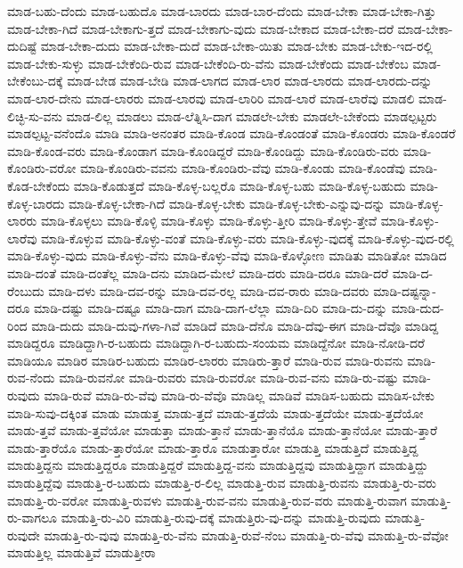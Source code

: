 {ಮಾಡ-ಬಹು-ದೆಂದು
ಮಾಡ-ಬಹುದೊ
ಮಾಡ-ಬಾರದು
ಮಾಡ-ಬಾರ-ದೆಂದು
ಮಾಡ-ಬೇಕಾ
ಮಾಡ-ಬೇಕಾ-ಗಿತ್ತು
ಮಾಡ-ಬೇಕಾ-ಗಿದೆ
ಮಾಡ-ಬೇಕಾಗು-ತ್ತದೆ
ಮಾಡ-ಬೇಕಾಗು-ವುದು
ಮಾಡ-ಬೇಕಾದ
ಮಾಡ-ಬೇಕಾ-ದರೆ
ಮಾಡ-ಬೇಕಾ-ದುದಿಷ್ಟೆ
ಮಾಡ-ಬೇಕಾ-ದುದು
ಮಾಡ-ಬೇಕಾ-ದುದೆ
ಮಾಡ-ಬೇಕಾ-ಯಿತು
ಮಾಡ-ಬೇಕು
ಮಾಡ-ಬೇಕು-ಇದ-ರಲ್ಲಿ
ಮಾಡ-ಬೇಕು-ಸುಳ್ಳು
ಮಾಡ-ಬೇಕೆಂದಿ-ರುವ
ಮಾಡ-ಬೇಕೆಂದಿ-ರು-ವೆನು
ಮಾಡ-ಬೇಕೆಂದು
ಮಾಡ-ಬೇಕೆಂಬ
ಮಾಡ-ಬೇಕೆಂಬು-ದಕ್ಕೆ
ಮಾಡ-ಬೇಡ
ಮಾಡ-ಬೇಡಿ
ಮಾಡ-ಲಾಗದ
ಮಾಡ-ಲಾರ
ಮಾಡ-ಲಾರದು
ಮಾಡ-ಲಾರದು-ದನ್ನು
ಮಾಡ-ಲಾರ-ದೇನು
ಮಾಡ-ಲಾರರು
ಮಾಡ-ಲಾರವು
ಮಾಡ-ಲಾರಿರಿ
ಮಾಡ-ಲಾರೆ
ಮಾಡ-ಲಾರೆವು
ಮಾಡಲಿ
ಮಾಡ-ಲಿಚ್ಛಿ-ಸು-ವನು
ಮಾಡ-ಲಿಲ್ಲ
ಮಾಡಲು
ಮಾಡ-ಲೆತ್ನಿಸಿ-ದಾಗ
ಮಾಡಲೇ-ಬೇಕು
ಮಾಡಲೇ-ಬೇಕೆಂದು
ಮಾಡಲ್ಪಟ್ಟರು
ಮಾಡಲ್ಪಟ್ಟ-ವನೆಂದೊ
ಮಾಡಿ
ಮಾಡಿ-ಅನಂತರ
ಮಾಡಿ-ಕೊಂಡ
ಮಾಡಿ-ಕೊಂಡಂತೆ
ಮಾಡಿ-ಕೊಂಡರು
ಮಾಡಿ-ಕೊಂಡರೆ
ಮಾಡಿ-ಕೊಂಡ-ವರು
ಮಾಡಿ-ಕೊಂಡಾಗ
ಮಾಡಿ-ಕೊಂಡಿದ್ದರೆ
ಮಾಡಿ-ಕೊಂಡಿದ್ದು
ಮಾಡಿ-ಕೊಂಡಿರು-ವರು
ಮಾಡಿ-ಕೊಂಡಿರು-ವರೋ
ಮಾಡಿ-ಕೊಂಡಿರು-ವವನು
ಮಾಡಿ-ಕೊಂಡಿರು-ವೆವು
ಮಾಡಿ-ಕೊಂಡು
ಮಾಡಿ-ಕೊಂಡೆವು
ಮಾಡಿ-ಕೊಡ-ಬೇಕೆಂದು
ಮಾಡಿ-ಕೊಡುತ್ತದೆ
ಮಾಡಿ-ಕೊಳ್ಳ-ಬಲ್ಲರೊ
ಮಾಡಿ-ಕೊಳ್ಳ-ಬಹು
ಮಾಡಿ-ಕೊಳ್ಳ-ಬಹುದು
ಮಾಡಿ-ಕೊಳ್ಳ-ಬಾರದು
ಮಾಡಿ-ಕೊಳ್ಳ-ಬೇಕಾ-ಗಿದೆ
ಮಾಡಿ-ಕೊಳ್ಳ-ಬೇಕು
ಮಾಡಿ-ಕೊಳ್ಳ-ಬೇಕು-ಎನ್ನುವು-ದನ್ನು
ಮಾಡಿ-ಕೊಳ್ಳ-ಲಾರರು
ಮಾಡಿ-ಕೊಳ್ಳಲು
ಮಾಡಿ-ಕೊಳ್ಳಿ
ಮಾಡಿ-ಕೊಳ್ಳು
ಮಾಡಿ-ಕೊಳ್ಳು-ತ್ತೀರಿ
ಮಾಡಿ-ಕೊಳ್ಳು-ತ್ತೇವೆ
ಮಾಡಿ-ಕೊಳ್ಳು-ಲಾರೆವು
ಮಾಡಿ-ಕೊಳ್ಳುವ
ಮಾಡಿ-ಕೊಳ್ಳು-ವಂತೆ
ಮಾಡಿ-ಕೊಳ್ಳು-ವರು
ಮಾಡಿ-ಕೊಳ್ಳು-ವುದಕ್ಕೆ
ಮಾಡಿ-ಕೊಳ್ಳು-ವುದ-ರಲ್ಲಿ
ಮಾಡಿ-ಕೊಳ್ಳು-ವುದು
ಮಾಡಿ-ಕೊಳ್ಳು-ವೆನು
ಮಾಡಿ-ಕೊಳ್ಳು-ವೆವು
ಮಾಡಿ-ಕೊಳ್ಳೋಣ
ಮಾಡಿತು
ಮಾಡಿತೋ
ಮಾಡಿದ
ಮಾಡಿ-ದಂತೆ
ಮಾಡಿ-ದಂತೆಲ್ಲ
ಮಾಡಿ-ದನು
ಮಾಡಿದ-ಮೇಲೆ
ಮಾಡಿ-ದರು
ಮಾಡಿ-ದರೂ
ಮಾಡಿ-ದರೆ
ಮಾಡಿ-ದ-ರೆಂಬುದು
ಮಾಡಿ-ದಳು
ಮಾಡಿ-ದವ-ರನ್ನು
ಮಾಡಿ-ದವ-ರಲ್ಲ
ಮಾಡಿ-ದವ-ರಾರು
ಮಾಡಿ-ದವರು
ಮಾಡಿ-ದಷ್ಟನ್ನಾ-ದರೂ
ಮಾಡಿ-ದಷ್ಟು
ಮಾಡಿ-ದಷ್ಟೂ
ಮಾಡಿ-ದಾಗ
ಮಾಡಿ-ದಾಗ-ಲೆಲ್ಲಾ
ಮಾಡಿ-ದಿರಿ
ಮಾಡಿ-ದು-ದನ್ನು
ಮಾಡಿ-ದುದ-ರಿಂದ
ಮಾಡಿ-ದುದು
ಮಾಡಿ-ದುವು-ಗಳಾ-ಗಿವೆ
ಮಾಡಿದೆ
ಮಾಡಿ-ದೆನೊ
ಮಾಡಿ-ದೆವು-ಈಗ
ಮಾಡಿ-ದೆವೊ
ಮಾಡಿದ್ದ
ಮಾಡಿದ್ದರೂ
ಮಾಡಿದ್ದಾಗಿ-ರ-ಬಹುದು
ಮಾಡಿದ್ದಾಗಿ-ರ-ಬಹುದು-ಸಂಯಮ
ಮಾಡಿದ್ದೆನೋ
ಮಾಡಿ-ನೋಡಿ-ದರೆ
ಮಾಡಿಯೂ
ಮಾಡಿರ
ಮಾಡಿರ-ಬಹುದು
ಮಾಡಿರ-ಲಾರರು
ಮಾಡಿರು-ತ್ತಾರೆ
ಮಾಡಿ-ರುವ
ಮಾಡಿ-ರುವನು
ಮಾಡಿ-ರುವ-ನೆಂದು
ಮಾಡಿ-ರುವನೋ
ಮಾಡಿ-ರುವರು
ಮಾಡಿ-ರುವರೋ
ಮಾಡಿ-ರುವ-ವನು
ಮಾಡಿ-ರು-ವಷ್ಟು
ಮಾಡಿ-ರುವುದು
ಮಾಡಿ-ರುವೆ
ಮಾಡಿ-ರು-ವೆವು
ಮಾಡಿ-ರು-ವೆವೊ
ಮಾಡಿಲ್ಲ
ಮಾಡಿವೆ
ಮಾಡಿಸ-ಬಹುದು
ಮಾಡಿಸ-ಬೇಕು
ಮಾಡಿ-ಸುವು-ದಕ್ಕಿಂತ
ಮಾಡು
ಮಾಡುತ್ತ
ಮಾಡು-ತ್ತದೆ
ಮಾಡು-ತ್ತದೆಯೆ
ಮಾಡು-ತ್ತದೆಯೇ
ಮಾಡು-ತ್ತದೆಯೋ
ಮಾಡು-ತ್ತವೆ
ಮಾಡು-ತ್ತವೆಯೋ
ಮಾಡುತ್ತಾ
ಮಾಡು-ತ್ತಾನೆ
ಮಾಡು-ತ್ತಾನೆಯೊ
ಮಾಡು-ತ್ತಾನೆಯೋ
ಮಾಡು-ತ್ತಾರೆ
ಮಾಡು-ತ್ತಾರೆಯೊ
ಮಾಡು-ತ್ತಾರೆಯೋ
ಮಾಡು-ತ್ತಾರೊ
ಮಾಡುತ್ತಾರೋ
ಮಾಡುತ್ತಿ
ಮಾಡುತ್ತಿದೆ
ಮಾಡುತ್ತಿದ್ದ
ಮಾಡುತ್ತಿದ್ದನು
ಮಾಡುತ್ತಿದ್ದರೂ
ಮಾಡುತ್ತಿದ್ದರೆ
ಮಾಡುತ್ತಿದ್ದ-ವನು
ಮಾಡುತ್ತಿದ್ದವು
ಮಾಡುತ್ತಿದ್ದಾಗ
ಮಾಡುತ್ತಿದ್ದು
ಮಾಡುತ್ತಿದ್ದೆವು
ಮಾಡುತ್ತಿ-ರ-ಬಹುದು
ಮಾಡುತ್ತಿ-ರ-ಲಿಲ್ಲ
ಮಾಡುತ್ತಿ-ರುವ
ಮಾಡುತ್ತಿ-ರುವನು
ಮಾಡುತ್ತಿ-ರು-ವರು
ಮಾಡುತ್ತಿ-ರು-ವರೋ
ಮಾಡುತ್ತಿ-ರುವಳು
ಮಾಡುತ್ತಿ-ರುವ-ವನು
ಮಾಡುತ್ತಿ-ರುವ-ವರು
ಮಾಡುತ್ತಿ-ರುವಾಗ
ಮಾಡುತ್ತಿ-ರು-ವಾಗಲೂ
ಮಾಡುತ್ತಿ-ರು-ವಿರಿ
ಮಾಡುತ್ತಿ-ರುವು-ದಕ್ಕೆ
ಮಾಡುತ್ತಿರು-ವು-ದನ್ನು
ಮಾಡುತ್ತಿ-ರುವುದು
ಮಾಡುತ್ತಿ-ರುವುದೇ
ಮಾಡುತ್ತಿ-ರು-ವುವು
ಮಾಡುತ್ತಿ-ರು-ವೆನು
ಮಾಡುತ್ತಿ-ರುವೆ-ನೆಂಬ
ಮಾಡುತ್ತಿ-ರು-ವೆವು
ಮಾಡುತ್ತಿ-ರು-ವೆವೋ
ಮಾಡುತ್ತಿಲ್ಲ
ಮಾಡುತ್ತಿವೆ
ಮಾಡುತ್ತೀರಾ
}
